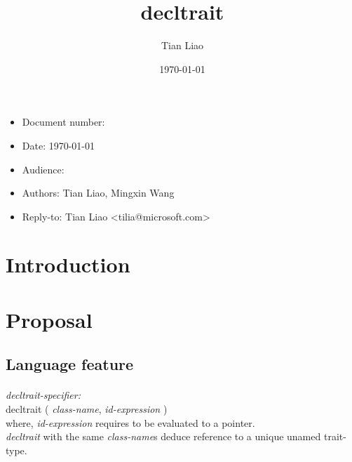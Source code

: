 \documentclass{article}
\title{decltrait}
\author{Tian Liao}
\date{\today}
\begin{document}
\maketitle
\vfill
\begin{itemize}[noitemsep]
  \item[] Document number:
  \item[] Date: \today
  \item[] Audience:
  \item[] Authors: Tian Liao, Mingxin Wang
  \item[] Reply-to: Tian Liao \textless tilia@microsoft.com\textgreater
\end{itemize}

\newpage
{}

\section{Introduction}

\section{Proposal}

\subsection{Language feature}
\paragraph{} \textit{decltrait-specifier:} \\
\indent decltrait ( \textit{class-name}, \textit{id-expression} ) \\
where, \textit{id-expression} requires to be evaluated to a pointer. \\
\textit{decltrait} with the same \textit{class-name}s deduce reference to a unique unamed trait-type.
\end{document}
